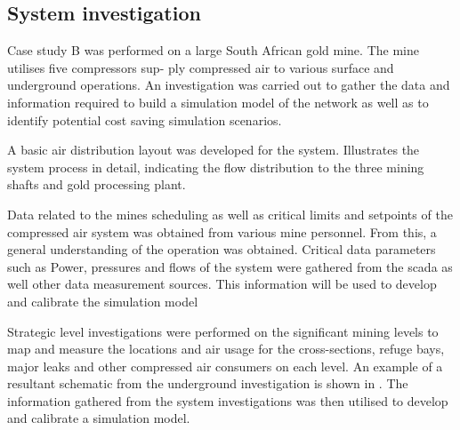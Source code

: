 	\subsection{System investigation}
	Case study B was performed on a large South African gold mine.   The mine utilises five compressors sup-   ply compressed air to various surface and underground operations. An investigation was carried out to gather the data and information required to build a simulation model of the network as well as to identify potential cost saving simulation scenarios.
	\par 
	A basic air distribution layout was developed for the system.  Illustrates the system process in detail, indicating the flow distribution to the three mining shafts and gold processing plant.
	\par 
	Data related to the mines scheduling as well as critical limits and setpoints of the compressed air system was obtained from various mine personnel. From this, a general understanding of the operation was obtained.  Critical data parameters such as Power, pressures and flows of the system were gathered from the \gls{scada} as well other data measurement sources. This information will be used to develop and calibrate the simulation model
	\par 
	Strategic level investigations were performed on the significant mining levels to map and measure the locations and air usage for the cross-sections, refuge bays, major leaks and other compressed air consumers on each level. An example of a resultant schematic from the underground investigation is shown in . The information gathered from the system investigations was then utilised to develop and calibrate a simulation model.
